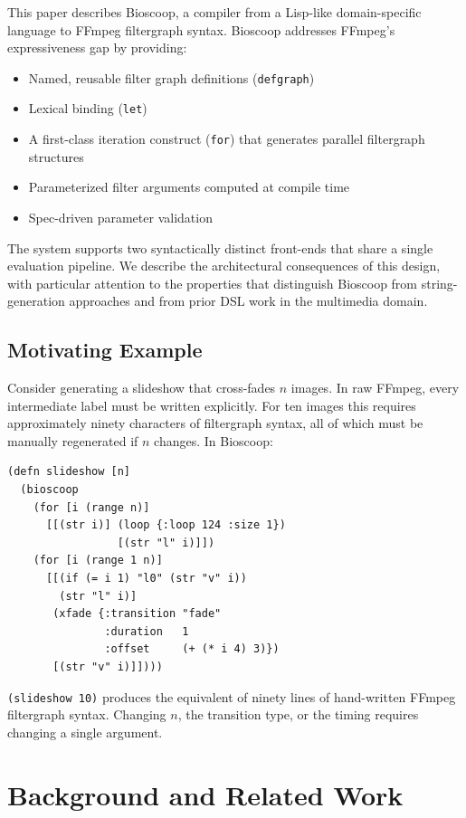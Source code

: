 \documentclass[conference]{IEEEtran}
\begin{document}
This paper describes Bioscoop, a compiler from a Lisp-like domain-specific language to FFmpeg filtergraph syntax. Bioscoop addresses FFmpeg's expressiveness gap by providing:

\begin{itemize}
\item Named, reusable filter graph definitions (\texttt{defgraph})
\item Lexical binding (\texttt{let})
\item A first-class iteration construct (\texttt{for}) that generates parallel filtergraph structures
\item Parameterized filter arguments computed at compile time
\item Spec-driven parameter validation
\end{itemize}

The system supports two syntactically distinct front-ends that share a single evaluation pipeline. We describe the architectural consequences of this design, with particular attention to the properties that distinguish Bioscoop from string-generation approaches and from prior DSL work in the multimedia domain.

\subsection{Motivating Example}

Consider generating a slideshow that cross-fades $n$ images. In raw FFmpeg, every intermediate label must be written explicitly. For ten images this requires approximately ninety characters of filtergraph syntax, all of which must be manually regenerated if $n$ changes. In Bioscoop:

\begin{lstlisting}[caption={Parameterized slideshow in Bioscoop}]
(defn slideshow [n]
  (bioscoop
    (for [i (range n)]
      [[(str i)] (loop {:loop 124 :size 1})
                 [(str "l" i)]])
    (for [i (range 1 n)]
      [[(if (= i 1) "l0" (str "v" i))
        (str "l" i)]
       (xfade {:transition "fade"
               :duration   1
               :offset     (+ (* i 4) 3)})
       [(str "v" i)]])))
\end{lstlisting}

\texttt{(slideshow 10)} produces the equivalent of ninety lines of hand-written FFmpeg filtergraph syntax. Changing $n$, the transition type, or the timing requires changing a single argument.

\section{Background and Related Work}
\end{document}
